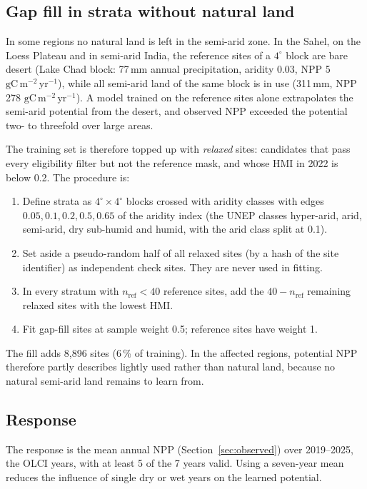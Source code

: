 \documentclass[11pt,a4paper]{article}
\newcommand{\npp}{\ensuremath{\mathrm{gC\,m^{-2}\,yr^{-1}}}}
\begin{document}
\subsection{Gap fill in strata without natural land}

In some regions no natural land is left in the semi-arid zone. In the Sahel, on the Loess
Plateau and in semi-arid India, the reference sites of a $4^\circ$ block are bare desert (Lake
Chad block: 77\,mm annual precipitation, aridity 0.03, NPP 5 \npp), while all semi-arid land of
the same block is in use (311\,mm, NPP 278 \npp). A model trained on the reference sites alone
extrapolates the semi-arid potential from the desert, and observed NPP exceeded the potential two-
to threefold over large areas.

The training set is therefore topped up with \emph{relaxed} sites: candidates that pass every
eligibility filter but not the reference mask, and whose HMI in 2022 is below 0.2. The procedure
is:
\begin{enumerate}
\item Define strata as $4^\circ \times 4^\circ$ blocks crossed with aridity classes with edges
$0.05, 0.1, 0.2, 0.5, 0.65$ of the aridity index (the UNEP classes hyper-arid, arid, semi-arid,
dry sub-humid and humid, with the arid class split at 0.1).
\item Set aside a pseudo-random half of all relaxed sites (by a hash of the site identifier)
as independent check sites. They are never used in fitting.
\item In every stratum with $n_{\text{ref}} < 40$ reference sites, add the $40 - n_{\text{ref}}$
remaining relaxed sites with the lowest HMI.
\item Fit gap-fill sites at sample weight 0.5; reference sites have weight 1.
\end{enumerate}
The fill adds 8,896 sites (6\,\% of training). In the affected regions, potential NPP therefore
partly describes lightly used rather than natural land, because no natural semi-arid land
remains to learn from.

\subsection{Response}

The response is the mean annual NPP (Section~\ref{sec:observed}) over 2019--2025, the OLCI
years, with at least 5 of the 7 years valid. Using a seven-year mean reduces the influence of
single dry or wet years on the learned potential.
\end{document}
